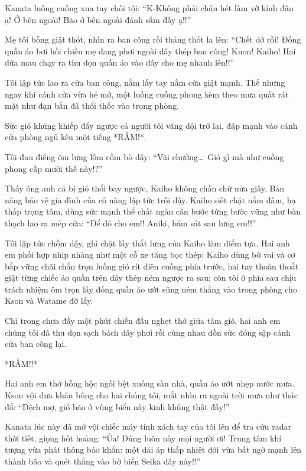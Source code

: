 \documentclass[../main.tex]{subfiles}
\begin{document}
Kanata luống cuống xua tay chối tội: ``K-Không phải cháu hét làm vỡ kính đâu ạ! Ở bên ngoài! Bão ở bên ngoài đánh sấm đấy ạ!!''

Mẹ tôi bỗng giật thót, nhìn ra ban công rồi thảng thốt la lên: ``Chết dở rồi! Đống quần áo bơi hồi chiều mẹ đang phơi ngoài dây thép ban công! Kuon! Kaiho! Hai đứa mau chạy ra thu dọn quần áo vào đây cho mẹ nhanh lên!!''

Tôi lập tức lao ra cửa ban công, nắm lấy tay nắm cửa giật mạnh. Thế nhưng ngay khi cánh cửa vừa hé mở, một luồng cuồng phong kèm theo mưa quất rát mặt như đạn bắn đã thổi thốc vào trong phòng.

Sức gió khủng khiếp đẩy ngược cả người tôi văng dội trở lại, đập mạnh vào cánh cửa phòng ngủ kêu một tiếng *RẦM!*.

Tôi đau điếng ôm lưng lồm cồm bò dậy: ``Vãi chưởng\dots\ Gió gì mà như cuồng phong cấp mười thế này!?''

Thấy ông anh cả bị gió thổi bay ngược, Kaiho không chần chừ nửa giây. Bản năng bảo vệ gia đình của cô nàng lập tức trỗi dậy. Kaiho siết chặt nắm đấm, hạ thấp trọng tâm, dùng sức mạnh thể chất ngàn cân bước từng bước vững như bàn thạch lao ra mép cửa: ``Để đó cho em!! Aniki, bám sát sau lưng em!!''

Tôi lập tức chồm dậy, ghì chặt lấy thắt lưng của Kaiho làm điểm tựa. Hai anh em phối hợp nhịp nhàng như một cỗ xe tăng bọc thép: Kaiho dùng bờ vai và cơ bắp vững chãi chắn trọn luồng gió rít điên cuồng phía trước, hai tay thoăn thoắt giật từng chiếc áo quần trên dây thép ném ngược ra sau; còn tôi ở phía sau chịu trách nhiệm ôm trọn lấy đống quần áo ướt sũng ném thẳng vào trong phòng cho Kson và Watame đỡ lấy.

Chỉ trong chưa đầy một phút chiến đấu nghẹt thở giữa tâm gió, hai anh em chúng tôi đã thu dọn sạch bách dây phơi rồi cùng nhau dồn sức đóng sập cánh cửa ban công lại.

*RẦM!!*

Hai anh em thở hồng hộc ngồi bệt xuống sàn nhà, quần áo ướt nhẹp nước mưa. Kson vội đưa khăn bông cho hai chúng tôi, mắt nhìn ra ngoài trời mưa như thác đổ: ``Đệch mợ, gió bão ở vùng biển này kinh khủng thật đấy!''

Kanata lúc này đã mở vội chiếc máy tính xách tay của tôi lên để tra cứu radar thời tiết, giọng hốt hoảng: ``Ủa! Đúng luôn này mọi người ơi! Trung tâm khí tượng vừa phát thông báo khẩn: một dải áp thấp nhiệt đới vừa bất ngờ mạnh lên thành bão và quét thẳng vào bờ biển Seika đây này!!''
\end{document}
